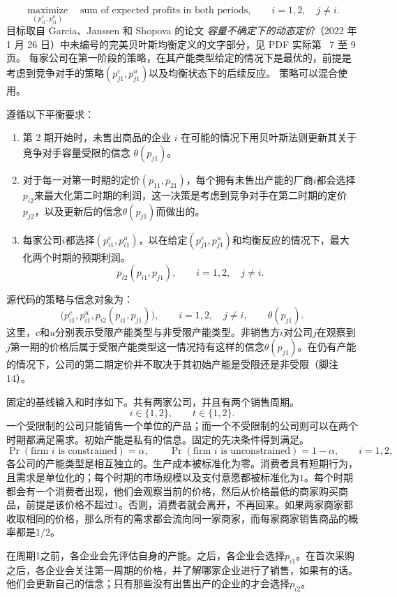 \documentclass{article}
\begin{document}
\[
\underset{(p_{i1}^{c},p_{i1}^{u})}{\operatorname{maximize}}
\quad \text{sum of expected profits in both periods},
\qquad i=1,2,\quad j\ne i.
\]
目标取自 Garcia、Janssen 和 Shopova 的论文 \emph{容量不确定下的动态定价}（2022 年 1 月 26 日）中未编号的完美贝叶斯均衡定义的文字部分，见 PDF 实际第 ~7 至 9 页。 每家公司在第一阶段的策略，在其产能类型给定的情况下是最优的，前提是考虑到竞争对手的策略$(p_{j1}^{c},p_{j1}^{u})$以及均衡状态下的后续反应。 策略可以混合使用。

遵循以下平衡要求：
\begin{enumerate}
\item 第 2 期开始时，未售出商品的企业 $i$ 在可能的情况下用贝叶斯法则更新其关于竞争对手容量受限的信念 $\theta(p_{j1})$。
\item 对于每一对第一时期的定价$(p_{11},p_{21})$，每个拥有未售出产能的厂商$i$都会选择$p_{i2}$来最大化第二时期的利润，这一决策是考虑到竞争对手在第二时期的定价$p_{j2}$，以及更新后的信念$\theta(p_{j1})$而做出的。
\item 每家公司$i$都选择$(p_{i1}^{c},p_{i1}^{u})$，以在给定$(p_{j1}^{c},p_{j1}^{u})$和均衡反应的情况下，最大化两个时期的预期利润。
\[
p_{i2}(p_{i1},p_{j1}),\qquad i=1,2,\quad j\ne i.
\]
\end{enumerate}
源代码的策略与信念对象为：
\[
\bigl(p_{i1}^{c},p_{i1}^{u},p_{i2}(p_{i1},p_{j1})\bigr),
\qquad i=1,2,\quad j\ne i,
\qquad \theta(p_{j1}).
\]
这里，$c$和$u$分别表示受限产能类型与非受限产能类型。非销售方$i$对公司$j$在观察到$j$第一期的价格后属于受限产能类型这一情况持有这样的信念$\theta(p_{j1})$。在仍有产能的情况下，公司的第二期定价并不取决于其初始产能是受限还是非受限（脚注14）。

固定的基线输入和时序如下。共有两家公司，并且有两个销售周期。
\[
i\in\{1,2\},\qquad t\in\{1,2\}.
\]
一个受限制的公司只能销售一个单位的产品；而一个不受限制的公司则可以在两个时期都满足需求。初始产能是私有的信息。固定的先决条件得到满足。
\[
\Pr(\text{firm }i\text{ is constrained})=\alpha,
\qquad
\Pr(\text{firm }i\text{ is unconstrained})=1-\alpha,
\qquad i=1,2,
\]
各公司的产能类型是相互独立的。生产成本被标准化为零。消费者具有短期行为，且需求是单位化的；每个时期的市场规模以及支付意愿都被标准化为$1$。每个时期都会有一个消费者出现，他们会观察当前的价格，然后从价格最低的商家购买商品，前提是该价格不超过$1$。否则，消费者就会离开，不再回来。如果两家商家都收取相同的价格，那么所有的需求都会流向同一家商家，而每家商家销售商品的概率都是$1/2$。

在周期1之前，各企业会先评估自身的产能。之后，各企业会选择$p_{i1}$。在首次采购之后，各企业会关注第一周期的价格，并了解哪家企业进行了销售，如果有的话。他们会更新自己的信念；只有那些没有出售出产的企业的才会选择$p_{i2}$。
\end{document}
